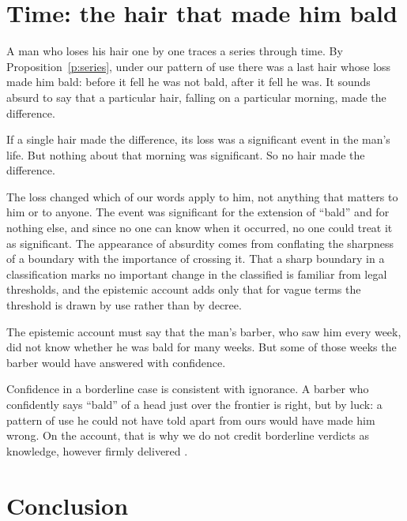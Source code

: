 \documentclass{situationist-preprint}
\begin{document}
\section{Time: the hair that made him bald}

A man who loses his hair one by one traces a series through time. By Proposition~\ref{p:series}, under our pattern of use there was a last hair whose loss made him bald: before it fell he was not bald, after it fell he was. It sounds absurd to say that a particular hair, falling on a particular morning, made the difference.

\begin{objection}
If a single hair made the difference, its loss was a significant event in the man's life. But nothing about that morning was significant. So no hair made the difference.
\end{objection}

\begin{reply}
The loss changed which of our words apply to him, not anything that matters to him or to anyone. The event was significant for the extension of \enquote{bald} and for nothing else, and since no one can know when it occurred, no one could treat it as significant. The appearance of absurdity comes from conflating the sharpness of a boundary with the importance of crossing it. That a sharp boundary in a classification marks no important change in the classified is familiar from legal thresholds, and the epistemic account adds only that for vague terms the threshold is drawn by use rather than by decree.
\end{reply}

\begin{objection}
The epistemic account must say that the man's barber, who saw him every week, did not know whether he was bald for many weeks. But some of those weeks the barber would have answered with confidence.
\end{objection}

\begin{reply}
Confidence in a borderline case is consistent with ignorance. A barber who confidently says \enquote{bald} of a head just over the frontier is right, but by luck: a pattern of use he could not have told apart from ours would have made him wrong. On the account, that is why we do not credit borderline verdicts as knowledge, however firmly delivered \citep[ch.~8]{Williamson1994}.
\end{reply}

\section{Conclusion}
\end{document}
